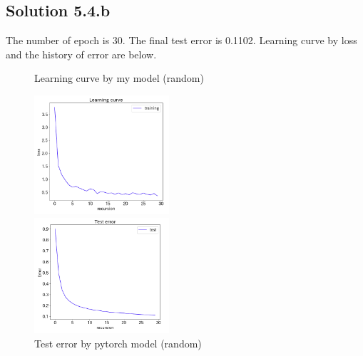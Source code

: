 \documentclass[a4paper]{article}
\theoremstyle{definition}
\newenvironment{soln}{
	\leavevmode\color{blue}\ignorespaces
}{}
\begin{document}
	\subsection*{Solution 5.4.b}
	\begin{soln}
	The number of epoch is 30. The final test error is 0.1102. Learning curve by loss and the history of error are below.
\begin{figure}[htbp]
\begin{minipage}{0.5\hsize}
\begin{center}
\caption{Learning curve by my model (random) }
\includegraphics[width=50mm]{./img/my_lc_b.png}
\end{center}
\captionsetup{labelformat=empty}
\end{minipage}
\begin{minipage}{0.5\hsize}
\begin{center}
\caption{Test error by pytorch model (random) }
\includegraphics[width=50mm]{./img/my_er_b.png}
\end{center}
\captionsetup{labelformat=empty}
\end{minipage}
\end{figure}

	\end{soln}

		

	
		
	
	
	
	
	
	
	
	
	
	
\end{document}
